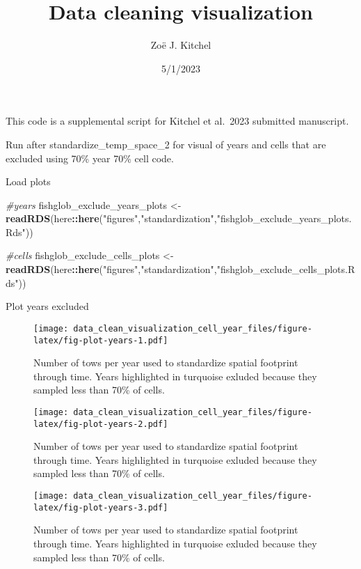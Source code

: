 \documentclass[
]{article}
\title{Data cleaning visualization}
\author{Zoë J. Kitchel}
\date{5/1/2023}
\newenvironment{Shaded}{\begin{snugshade}}{\end{snugshade}}
\newcommand{\CommentTok}[1]{\textcolor[rgb]{0.56,0.35,0.01}{\textit{#1}}}
\newcommand{\FunctionTok}[1]{\textcolor[rgb]{0.13,0.29,0.53}{\textbf{#1}}}
\newcommand{\NormalTok}[1]{#1}
\newcommand{\OtherTok}[1]{\textcolor[rgb]{0.56,0.35,0.01}{#1}}
\newcommand{\SpecialCharTok}[1]{\textcolor[rgb]{0.81,0.36,0.00}{\textbf{#1}}}
\newcommand{\StringTok}[1]{\textcolor[rgb]{0.31,0.60,0.02}{#1}}
\begin{document}
\maketitle

{
\setcounter{tocdepth}{2}
\tableofcontents
}
This code is a supplemental script for Kitchel et al.~2023 submitted manuscript.

Run after standardize\_temp\_space\_2 for visual of years and cells that are excluded using 70\% year 70\% cell code.

Load plots

\begin{Shaded}
\begin{Highlighting}[]
\CommentTok{\#years}
\NormalTok{fishglob\_exclude\_years\_plots }\OtherTok{\textless{}{-}} \FunctionTok{readRDS}\NormalTok{(here}\SpecialCharTok{::}\FunctionTok{here}\NormalTok{(}\StringTok{"figures"}\NormalTok{,}\StringTok{"standardization"}\NormalTok{,}\StringTok{"fishglob\_exclude\_years\_plots.Rds"}\NormalTok{))}

\CommentTok{\#cells}
\NormalTok{fishglob\_exclude\_cells\_plots }\OtherTok{\textless{}{-}} \FunctionTok{readRDS}\NormalTok{(here}\SpecialCharTok{::}\FunctionTok{here}\NormalTok{(}\StringTok{"figures"}\NormalTok{,}\StringTok{"standardization"}\NormalTok{,}\StringTok{"fishglob\_exclude\_cells\_plots.Rds"}\NormalTok{))}
\end{Highlighting}
\end{Shaded}

Plot years excluded

\begin{figure}
\centering
\texttt{[image: data\_clean\_visualization\_cell\_year\_files/figure-latex/fig-plot-years-1.pdf]}
\caption{\label{fig:fig-plot-years-1}Number of tows per year used to standardize spatial footprint through time. Years highlighted in turquoise exluded because they sampled less than 70\% of cells.}
\end{figure}

\begin{figure}
\centering
\texttt{[image: data\_clean\_visualization\_cell\_year\_files/figure-latex/fig-plot-years-2.pdf]}
\caption{\label{fig:fig-plot-years-2}Number of tows per year used to standardize spatial footprint through time. Years highlighted in turquoise exluded because they sampled less than 70\% of cells.}
\end{figure}

\begin{figure}
\centering
\texttt{[image: data\_clean\_visualization\_cell\_year\_files/figure-latex/fig-plot-years-3.pdf]}
\caption{\label{fig:fig-plot-years-3}Number of tows per year used to standardize spatial footprint through time. Years highlighted in turquoise exluded because they sampled less than 70\% of cells.}
\end{figure}
\end{document}
